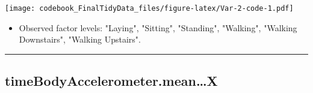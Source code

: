 \documentclass[
]{article}
\providecommand{\tightlist}{%
  \setlength{\itemsep}{0pt}\setlength{\parskip}{0pt}}
\begin{document}
\texttt{[image: codebook\_FinalTidyData\_files/figure-latex/Var-2-code-1.pdf]}

\begin{itemize}
\tightlist
\item
  Observed factor levels: "Laying", "Sitting", "Standing", "Walking",
  "Walking Downstairs", "Walking Upstairs".
\end{itemize}

\begin{center}\rule{0.5\linewidth}{0.5pt}\end{center}

\hypertarget{timebodyaccelerometer.meanx}{%
\subsection{timeBodyAccelerometer.mean\ldots X}\label{timebodyaccelerometer.meanx}}
\end{document}
